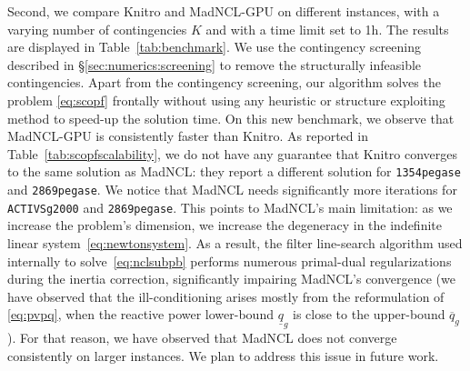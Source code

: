 \documentclass{IEEEtran4PSCC}
\newcommand{\add}[1]{#1}
\begin{document}
Second, we compare Knitro and MadNCL-GPU on different instances, with a varying number of contingencies $K$ and
with a time limit set to 1h.
The results are displayed in Table~\ref{tab:benchmark}.
\add{We use the contingency screening described in \S\ref{sec:numerics:screening} to remove
the structurally infeasible contingencies.
Apart from the contingency screening,
our algorithm solves the problem \eqref{eq:scopf} frontally without using any heuristic or structure exploiting method to speed-up the solution time.}
On this new benchmark, we observe that MadNCL-GPU is consistently faster than Knitro. As reported in Table~\ref{tab:scopfscalability},
we do not have any guarantee that Knitro converges to the same solution as MadNCL: they
report a different solution for {\tt 1354pegase} and {\tt 2869pegase}.
We notice that MadNCL needs significantly more iterations
for {\tt ACTIVSg2000} and {\tt 2869pegase}. This points to MadNCL's main limitation:
as we increase the problem's dimension, we increase the degeneracy in the indefinite linear system~\eqref{eq:newtonsystem}.
As a result, the filter line-search algorithm used internally to solve~\eqref{eq:nclsubpb}
performs numerous primal-dual regularizations during the inertia correction, significantly impairing MadNCL's convergence (we have observed that the ill-conditioning arises mostly from the reformulation
of \eqref{eq:pvpq}, when the reactive power lower-bound $\underline{q}_g$ is close to the upper-bound $\overline{q}_g$).
For that reason, we have observed that MadNCL does not converge consistently on larger instances.
We plan to address this issue in future work.
\end{document}
